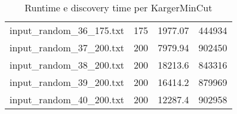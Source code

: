 \begin{table}[H]
\begin{tabular}{lrrr}
     input\_random\_36\_175.txt &     175 &         1977.07  &     444934     \\
     input\_random\_37\_200.txt &     200 &         7979.94  &     902450     \\
     input\_random\_38\_200.txt &     200 &        18213.6   &     843316     \\
     input\_random\_39\_200.txt &     200 &        16414.2   &     879969     \\
     input\_random\_40\_200.txt &     200 &        12287.4   &     902958     \\
     \hline
    \end{tabular}

    \caption{Runtime e discovery time per KargerMinCut}
    \label{table:karger-running-time}
\end{table}

